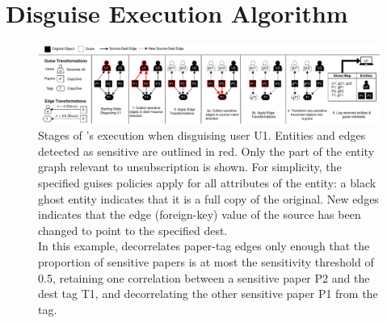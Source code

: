 \section{Disguise Execution Algorithm}

\begin{figure}[ht!]
    \centering
    \includegraphics[width=\textwidth]{img/algo}

    \caption{Stages of \sys's execution when disguising user U1. Entities and edges detected as
    sensitive are outlined in red. Only the part of the entity graph relevant to unsubscription is shown.
    For simplicity, the specified guises policies apply for all attributes
    of the entity: a black ghost entity indicates that it is a full copy of the original.
    New edges indicates that the edge (foreign-key) value of the source has been changed to
    point to the specified dest.\\
    In this example, \sys decorrelates paper-tag edges only enough that the proportion of sensitive papers
    is at most the sensitivity threshold of 0.5, retaining one correlation between a sensitive
    paper P2 and the dest tag T1, and decorrelating the other sensitive paper P1 from the tag.}
    \label{fig:algo}
\end{figure}


